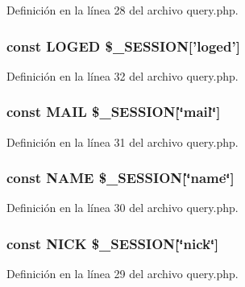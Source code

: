 Definición en la línea 28 del archivo query.\-php.

\hypertarget{query_8php_a2c67e1e38c1ba2b45b1fb652313c6d22}{
\subsubsection[{L\-O\-G\-E\-D}]{\setlength{\rightskip}{0pt plus 5cm}const L\-O\-G\-E\-D \$\-\_\-\-S\-E\-S\-S\-I\-O\-N\mbox{[}'loged'\mbox{]}}}\label{query_8php_a2c67e1e38c1ba2b45b1fb652313c6d22}


Definición en la línea 32 del archivo query.\-php.

\hypertarget{query_8php_a347ad8be6c67745f0c0fac9638a0eec2}{
\subsubsection[{M\-A\-I\-L}]{\setlength{\rightskip}{0pt plus 5cm}const M\-A\-I\-L \$\-\_\-\-S\-E\-S\-S\-I\-O\-N\mbox{[}\char`\"{}mail\char`\"{}\mbox{]}}}\label{query_8php_a347ad8be6c67745f0c0fac9638a0eec2}


Definición en la línea 31 del archivo query.\-php.

\hypertarget{query_8php_a244352f035b82b20b0efa506167fd862}{
\subsubsection[{N\-A\-M\-E}]{\setlength{\rightskip}{0pt plus 5cm}const N\-A\-M\-E \$\-\_\-\-S\-E\-S\-S\-I\-O\-N\mbox{[}\char`\"{}name\char`\"{}\mbox{]}}}\label{query_8php_a244352f035b82b20b0efa506167fd862}


Definición en la línea 30 del archivo query.\-php.

\hypertarget{query_8php_abdd850ab3ab0275cf56392a54ffb3af9}{
\subsubsection[{N\-I\-C\-K}]{\setlength{\rightskip}{0pt plus 5cm}const N\-I\-C\-K \$\-\_\-\-S\-E\-S\-S\-I\-O\-N\mbox{[}\char`\"{}nick\char`\"{}\mbox{]}}}\label{query_8php_abdd850ab3ab0275cf56392a54ffb3af9}


Definición en la línea 29 del archivo query.\-php.

